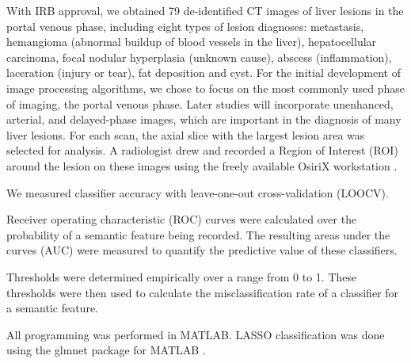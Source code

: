With IRB approval, we obtained 79 de-identified CT images of liver lesions in the portal venous phase, including eight types of lesion diagnoses: metastasis, hemangioma (abnormal buildup of blood vessels in the liver), hepatocellular carcinoma, focal nodular hyperplasia (unknown cause), abscess (inflammation), laceration (injury or tear), fat deposition and cyst. For the initial development of image processing algorithms, we chose to focus on the most commonly used phase of imaging, the portal venous phase. Later studies will incorporate unenhanced, arterial, and delayed-phase images, which are important in the diagnosis of many liver lesions. For each scan, the axial slice with the largest lesion area was selected for analysis. A radiologist drew and recorded a Region of Interest (ROI) around the lesion on these images using the freely available OsiriX workstation \cite{ArmatoIII:2007ks, Rosset:2004kk}.


We measured classifier accuracy with leave-one-out cross-validation (LOOCV). 

Receiver operating characteristic (ROC) curves were calculated over the probability of a semantic feature being recorded. The resulting areas under the curves (AUC) were measured to quantify the predictive value of these classifiers.

Thresholds were determined empirically over a range from 0 to 1. These thresholds were then used to calculate the misclassification rate of a classifier for a semantic feature.

All programming was performed in MATLAB. LASSO classification was done using the glmnet package for MATLAB \cite{Friedman:2009wm}.
